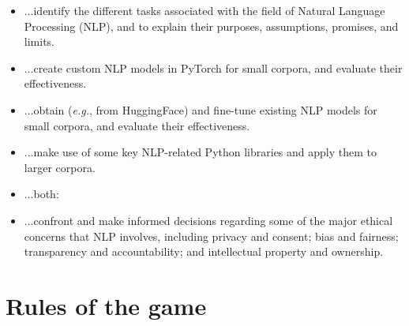 \documentclass[12pt]{article}
\begin{document}
\begin{itemize}

\item ...identify the different tasks associated with the field of Natural
Language Processing (NLP), and to explain their purposes, assumptions,
promises, and limits.

\item ...create custom NLP models in PyTorch for small corpora, and evaluate
their effectiveness.

\item ...obtain (\textit{e.g.}, from HuggingFace) and fine-tune existing NLP
models for small corpora, and evaluate their effectiveness.

\item ...make use of some key NLP-related Python libraries and apply them to
larger corpora.

\item ...both:


\item ...confront and make informed decisions regarding some of the major
ethical concerns that NLP involves, including privacy and consent; bias and
fairness; transparency and accountability; and intellectual property and
ownership.

\end{itemize}

\section*{Rules of the game}
\end{document}
